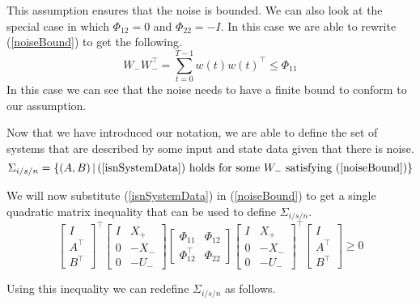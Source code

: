 This assumption ensures that the noise is bounded.
We can also look at the special case in which $\Phi_{12} = 0$ and $\Phi_{22} = -I$. In this case we are able to rewrite (\ref{noiseBound}) to get the following.
\begin{equation} \label{noiseBoundSpecialCase}
	W_- W_-^\top = \sum^{T-1}_{t = 0}w(t)w(t)^\top \leq \Phi_{11}
\end{equation}
In this case we can see that the noise needs to have a finite bound to conform to our assumption. 

Now that we have introduced our notation, we are able to define the set of systems that are described by some input and state data given that there is noise.
\begin{equation} \label{isnSet}
\Sigma_{i/s/n} = \left\{ (A,B) \, | \, \mbox{(\ref{isnSystemData}) holds for some }W_- \mbox{ satisfying (\ref{noiseBound})} \right\}
\end{equation}

We will now substitute (\ref{isnSystemData}) in (\ref{noiseBound}) to get a single quadratic matrix inequality that can be used to define $\Sigma_{i/s/n}$.
\begin{equation} \label{noiseSystemQMI}
	\begin{bmatrix} I \\ A^\top \\ B^\top \end{bmatrix}^\top
	\begin{bmatrix} I&X_+ \\ 0 & -X_- \\ 0&-U_- \end{bmatrix}
	\begin{bmatrix} \Phi_{11} & \Phi_{12} \\ \Phi_{12}^\top & \Phi_{22} \end{bmatrix}
	\begin{bmatrix} I&X_+ \\ 0 & -X_- \\ 0&-U_- \end{bmatrix}^\top
	\begin{bmatrix} I \\ A^\top \\ B^\top \end{bmatrix} \geq 0
\end{equation}

Using this inequality we can redefine $\Sigma_{i/s/n}$ as follows.


















